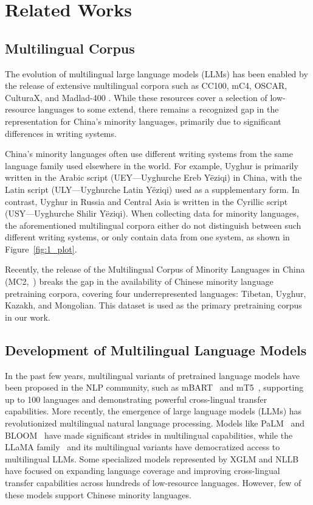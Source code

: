 \section{Related Works}
\label{sec:related-work}
\subsection{Multilingual Corpus}
The evolution of multilingual large language models (LLMs) has been enabled by the release of extensive multilingual corpora such as CC100, mC4, OSCAR, CulturaX, and Madlad-400 \cite{CC100,mc4,OSCAR,culturax,Madlad}. While these resources cover a selection of low-resource languages to some extend, there remains a recognized gap in the representation for China's minority languages, primarily due to significant differences in writing systems.
   
China’s minority languages often use different writing systems from the same language family used elsewhere in the world. For example, Uyghur is primarily written in the Arabic script (UEY—Uyghurche Ereb Yëziqi) in China, with the Latin script (ULY—Uyghurche Latin Yëziqi) used as a supplementary form. In contrast, Uyghur in Russia and Central Asia is written in the Cyrillic script (USY—Uyghurche Shilir Yëziqi). When collecting data for minority languages, the aforementioned multilingual corpora either do not distinguish between such different writing systems, or only contain data from one system, as shown in Figure~\ref{fig:1_plot}.
   
Recently, the release of the Multilingual Corpus of Minority Languages in China (MC2,~\citealp{mc2}) breaks the gap in the availability of Chinese minority language pretraining corpora, covering four underrepresented languages: Tibetan, Uyghur, Kazakh, and Mongolian. This dataset is used as the primary pretraining corpus in our work.

    
\subsection{Development of Multilingual Language Models}
In the past few years, multilingual variants of pretrained language models have been proposed in the NLP community, such as mBART~\citep{mbart} and mT5~\citep{mt5}, supporting up to 100 languages and demonstrating powerful cross-lingual transfer capabilities. More recently, the emergence of large language models (LLMs) has revolutionized multilingual natural language processing. Models like PaLM~\citep{palm} and BLOOM~\citep{bloom} have made significant strides in multilingual capabilities, while the LLaMA family~\citep{llama} and its multilingual variants have democratized access to multilingual LLMs. Some specialized models represented by XGLM and NLLB~\citep{xglm,nllb} have focused on expanding language coverage and improving cross-lingual transfer capabilities across hundreds of low-resource languages. However, few of these models support Chinese minority languages.

